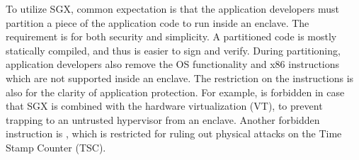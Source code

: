 To utilize SGX, common expectation is that the application developers must partition a piece of the application code to run inside an enclave.
The requirement is for both security and simplicity.
A partitioned code is mostly statically compiled, and thus is easier to sign and verify.
During partitioning, application developers also remove the OS functionality and x86 instructions which are not supported inside an enclave.
The restriction on the instructions is also for the clarity of application protection.
For example,
 is forbidden in case that SGX is combined with the hardware virtualization (VT),
to prevent trapping to an untrusted hypervisor from an enclave.
Another forbidden instruction is , which is restricted for ruling out physical attacks on the Time Stamp Counter (TSC). 








